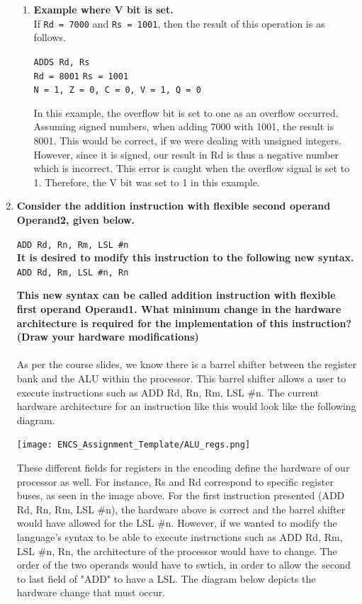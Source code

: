 \documentclass{article}
\begin{document}
\begin{enumerate}
\begin{enumerate}
        \item \textbf{Example where V bit is set.}
        \\
        If  \texttt{Rd = 7000}  and  \texttt{Rs = 1001},  then the result of this operation is as follows.
        \begin{center}
            \texttt{ADDS Rd, Rs}
            \\
            \texttt{Rd = 8001} \hspace{0.4cm}  \texttt{Rs = 1001} \\
            \texttt{N = 1, Z = 0, C = 0, V = 1, Q = 0}
        \end{center}
        In this example, the overflow bit is set to one as an overflow occurred. Assuming signed numbers, when adding 7000 with 1001, the result is 8001. This would be correct, if we were dealing with unsigned integers. However, since it is signed, our result in Rd is thus a negative number which is incorrect. This error is caught when the overflow signal is set to 1. Therefore, the V bit was set to 1 in this example.
    \end{enumerate}
	\item \textbf{Consider the addition instruction with flexible second operand Operand2, given below.}
	\begin{center}
	\texttt{ADD Rd, Rn, Rm, LSL \#n} 
	\\ \vspace{0.4cm}
	\textbf{It is desired to modify this instruction to the following new syntax.} \newline \newline
	\texttt{ADD Rd, Rm, LSL \#n, Rn} 
	\end{center}
	\textbf{This new syntax can be called addition instruction with flexible first operand Operand1. What minimum change in the hardware architecture is required for the implementation of this instruction? (Draw your hardware modifications)}
    \\
    \\
	As per the course slides, we know there is a barrel shifter between the register bank and the ALU within the processor. This barrel shifter allows a user to execute instructions such as ADD Rd, Rn, Rm, LSL \#n. The current hardware architecture for an instruction like this would look like the following diagram.
	\begin{center}
	    \texttt{[image: ENCS\_Assignment\_Template/ALU\_regs.png]}
	\end{center}
	These different fields for registers in the encoding define the hardware of our processor as well. For instance, Rs and Rd correspond to specific register buses, as seen in the image above. For the first instruction presented (ADD Rd, Rn, Rm, LSL \#n), the hardware above is correct and the barrel shifter would have allowed for the LSL \#n. However, if we wanted to modify the language's syntax to be able to execute instructions such as ADD Rd, Rm, LSL \#n, Rn, the architecture of the processor would have to change. The order of the two operands would have to swtich, in order to allow the second to last field of "ADD" to have a LSL. The diagram below depicts the hardware change that must occur. 

\end{enumerate}
\end{document}
